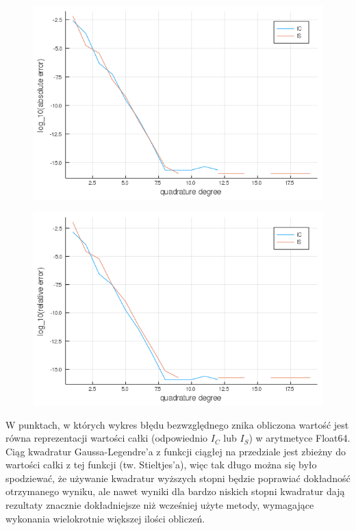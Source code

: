 \documentclass{article}
\begin{document}
\begin{figure}[ht]
    \includegraphics[scale=0.5]{WykresD1logabsolute.png}
    \label{wykresDabsolute}
\end{figure}
\begin{figure}[ht]
    \includegraphics[scale=0.5]{WykresD1logrelative.png}
    \label{wykresDrel}
\end{figure}

\newpage
W punktach, w których wykres błędu bezwzględnego znika obliczona wartość jest równa reprezentacji wartości całki (odpowiednio $I_C$ lub $I_S$) w arytmetyce Float64. Ciąg kwadratur Gaussa-Legendre'a z funkcji ciągłej na przedziale jest zbieżny do wartości całki z tej funkcji (tw. Stieltjes'a), więc tak długo można się było spodziewać, że używanie kwadratur wyższych stopni będzie poprawiać dokładność otrzymanego wyniku, ale nawet wyniki dla bardzo niskich stopni kwadratur dają rezultaty znacznie dokładniejsze niż wcześniej użyte metody, wymagające wykonania wielokrotnie większej ilości obliczeń.
\end{document}
